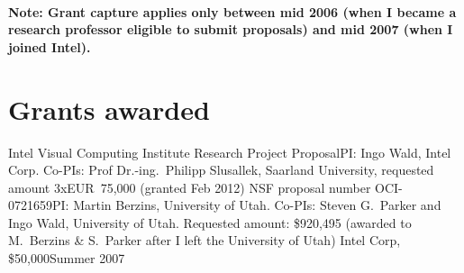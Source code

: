 \documentclass[letterpaper,11pt]{moderncv}
\begin{document}











\pagebreak

\vspace*{-8mm}

~\\
\begin{center}
{%
\textbf{Note: Grant capture applies only between mid 2006 (when I became a research professor eligible to submit proposals) and mid 2007 (when I joined Intel).}}
\end{center}

\section{Grants awarded}

{Intel Visual Computing Institute Research Project Proposal}{PI: Ingo Wald, Intel Corp. Co-PIs: Prof Dr.-ing.\ Philipp Slusallek, Saarland University, requested amount 3xEUR~75,000 (granted Feb 2012)}{}
%
{NSF proposal number OCI-0721659}{PI: Martin Berzins, University of Utah. Co-PIs: Steven G.\ Parker and Ingo Wald,  University of Utah. Requested amount: \$920,495 (awarded to M.\ Berzins \& S.\ Parker after I left the University of Utah)}{}
%
%
{Intel Corp, \$50,000}{Summer 2007}{}
%
\closesection
\end{document}
